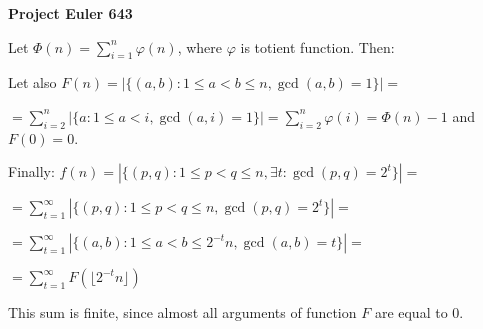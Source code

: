 \documentclass[a4paper,12pt]{article}
\begin{document}
\setlength\parindent{0pt}
\textbf{Project Euler 643}
\vspace{5ex}

Let \(\Phi(n) = \sum_{i = 1}^n \varphi(n)\), where \(\varphi\) is totient function. Then:

Let also \(F(n) = \left| \{ (a, b): 1 \leq a < b \leq n, \gcd(a, b) = 1\} \right| = \)

\(= \sum_{i = 2}^n \left| \{a: 1 \leq a < i, \gcd(a, i) = 1\} \right| = \sum_{i = 2}^n \varphi(i) = \Phi(n) - 1\) and \(F(0) = 0\).

Finally: \(f(n) = \left| \{ (p, q): 1 \leq p < q \leq n, \exists t: \gcd(p, q) = 2^t\} \right| = \)

\(= \sum_{t = 1}^\infty \left| \{ (p, q): 1 \leq p < q \leq n, \gcd(p, q) = 2^t\} \right| =\)

\(= \sum_{t = 1}^\infty \left| \{ (a, b): 1 \leq a < b \leq 2^{-t}n, \gcd(a, b) = t\} \right| =\)

\(= \sum_{t = 1}^\infty F\left(\lfloor 2^{-t}n \rfloor\right)\)

This sum is finite, since almost all arguments of function \(F\) are equal to 0.
\end{document}
